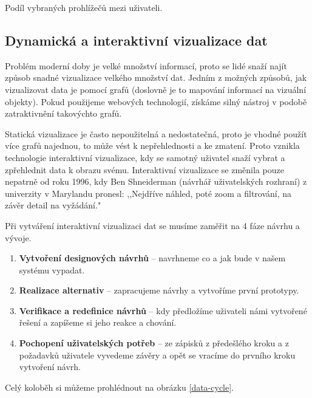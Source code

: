 \begin{graph}[H]
\centering
{}
\caption{Podíl vybraných prohlížečů mezi uživateli.}
\label{browser-share}
\end{graph}
\subsection{Dynamická a interaktivní vizualizace dat}
\par Problém moderní doby je velké množství informací, proto se lidé snaží najít způsob snadné vizualizace velkého množství dat. Jedním z možných způsobů, jak vizualizovat data je pomocí grafů (doslovně je to mapování informací na vizuální objekty). Pokud použijeme webových technologií, získáme silný nástroj v podobě zatraktivnění takovýchto grafů. \cite{interactive-data-reily}

\par Statická vizualizace je často nepoužitelná a nedostatečná, proto je vhodné použít více grafů najednou, to může vést k nepřehlednosti a ke zmatení. Proto vznikla technologie interaktivní vizualizace, kdy se samotný uživatel snaží vybrat a zpřehlednit data k obrazu svému. Interaktivní vizualizace se změnila pouze nepatrně od roku 1996, kdy Ben Shneiderman (návrhář uživatelských rozhraní) z univerzity v Marylandu pronesl: ,,Nejdříve náhled, poté zoom a filtrování, na závěr detail na vyžádání."\cite{interactive-data-reily}

\par Při vytváření interaktivní vizualizaci dat se musíme zaměřit na 4 fáze návrhu a vývoje.
\begin{enumerate}
\item \textbf{Vytvoření designových návrhů} -- navrhneme co a jak bude v našem systému vypadat.
\item \textbf{Realizace alternativ} -- zapracujeme návrhy a vytvoříme první prototypy.
\item \textbf{Verifikace a redefinice návrhů} -- kdy předložíme uživateli námi vytvořené řešení a zapíšeme si jeho reakce a chování.
\item \textbf{Pochopení uživatelských potřeb} -- ze zápisků z předešlého kroku a z požadavků uživatele vyvedeme závěry a opět se vracíme do prvního kroku vytvoření návrh. \cite{the-ux-book}
\end{enumerate}
 Celý koloběh si můžeme prohlédnout na obrázku \ref{data-cycle}.

